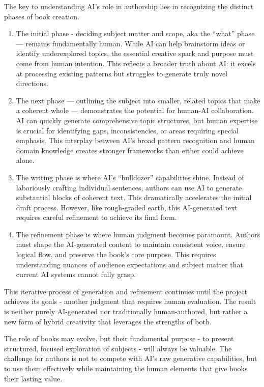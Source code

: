 \documentclass[
  Letterpaper,
]{scrbook}
\begin{document}
The key to understanding AI's role in authorship lies in recognizing the
distinct phases of book creation.

\begin{enumerate}
\def\labelenumi{\arabic{enumi}.}
\item
  The initial phase - deciding subject matter and scope, aka the
  ``what'' phase --- remains fundamentally human. While AI can help
  brainstorm ideas or identify underexplored topics, the essential
  creative spark and purpose must come from human intention. This
  reflects a broader truth about AI: it excels at processing existing
  patterns but struggles to generate truly novel directions.
\item
  The next phase --- outlining the subject into smaller, related topics
  that make a coherent whole --- demonstrates the potential for human-AI
  collaboration. AI can quickly generate comprehensive topic structures,
  but human expertise is crucial for identifying gaps, inconsistencies,
  or areas requiring special emphasis. This interplay between AI's broad
  pattern recognition and human domain knowledge creates stronger
  frameworks than either could achieve alone.
\item
  The writing phase is where AI's ``bulldozer'' capabilities shine.
  Instead of laboriously crafting individual sentences, authors can use
  AI to generate substantial blocks of coherent text. This dramatically
  accelerates the initial draft process. However, like rough-graded
  earth, this AI-generated text requires careful refinement to achieve
  its final form.
\item
  The refinement phase is where human judgment becomes paramount.
  Authors must shape the AI-generated content to maintain consistent
  voice, ensure logical flow, and preserve the book's core purpose. This
  requires understanding nuances of audience expectations and subject
  matter that current AI systems cannot fully grasp.
\end{enumerate}

This iterative process of generation and refinement continues until the
project achieves its goals - another judgment that requires human
evaluation. The result is neither purely AI-generated nor traditionally
human-authored, but rather a new form of hybrid creativity that
leverages the strengths of both.

The role of books may evolve, but their fundamental purpose - to present
structured, focused exploration of subjects - will always be valuable.
The challenge for authors is not to compete with AI's raw generative
capabilities, but to use them effectively while maintaining the human
elements that give books their lasting value.
\end{document}
